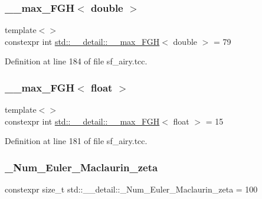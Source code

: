 \subsubsection{\texorpdfstring{\+\_\+\+\_\+max\+\_\+\+F\+G\+H$<$ double $>$}{\_\_max\_FGH< double >}}
{\footnotesize\ttfamily template$<$$>$ \\
constexpr int \hyperlink{namespacestd_1_1____detail_ae3ef7007b55cd83fa162820c809a2995}{std\+::\+\_\+\+\_\+detail\+::\+\_\+\+\_\+max\+\_\+\+F\+GH}$<$ double $>$ = 79}



Definition at line 184 of file sf\+\_\+airy.\+tcc.

\mbox{\label{namespacestd_1_1____detail_a67195934ce49105fd7b765e669a5a2a0}} 
\subsubsection{\texorpdfstring{\+\_\+\+\_\+max\+\_\+\+F\+G\+H$<$ float $>$}{\_\_max\_FGH< float >}}
{\footnotesize\ttfamily template$<$$>$ \\
constexpr int \hyperlink{namespacestd_1_1____detail_ae3ef7007b55cd83fa162820c809a2995}{std\+::\+\_\+\+\_\+detail\+::\+\_\+\+\_\+max\+\_\+\+F\+GH}$<$ float $>$ = 15}



Definition at line 181 of file sf\+\_\+airy.\+tcc.

\mbox{\label{namespacestd_1_1____detail_ab27e687e1052be7a72de187e0dead124}} 
\subsubsection{\texorpdfstring{\+\_\+\+Num\+\_\+\+Euler\+\_\+\+Maclaurin\+\_\+zeta}{\_Num\_Euler\_Maclaurin\_zeta}}
{\footnotesize\ttfamily constexpr size\+\_\+t std\+::\+\_\+\+\_\+detail\+::\+\_\+\+Num\+\_\+\+Euler\+\_\+\+Maclaurin\+\_\+zeta = 100}

